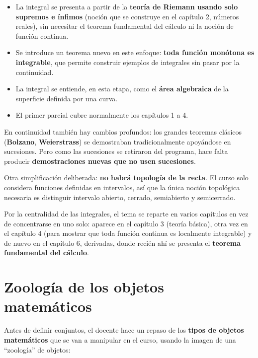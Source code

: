 \documentclass[12pt,a4paper]{article}
\begin{document}
\begin{itemize}
  \item La integral se presenta a partir de la \textbf{teoría de Riemann
    usando solo supremos e ínfimos} (noción que se construye en el
    capítulo 2, números reales), sin necesitar el teorema fundamental del
    cálculo ni la noción de función continua.
  \item Se introduce un teorema nuevo en este enfoque: \textbf{toda función
    monótona es integrable}, que permite construir ejemplos de integrales
    sin pasar por la continuidad.
  \item La integral se entiende, en esta etapa, como el \textbf{área
    algebraica} de la superficie definida por una curva.
  \item El primer parcial cubre normalmente los capítulos 1 a 4.
\end{itemize}

\begin{sloppypar}
En continuidad también hay cambios profundos: los grandes teoremas
clásicos (\textbf{Bolzano}, \textbf{Weierstrass}) se demostraban
tradicionalmente apoyándose en sucesiones. Pero como las sucesiones se
retiraron del programa, hace falta producir \textbf{demostraciones
nuevas que no usen sucesiones}.
\end{sloppypar}

Otra simplificación deliberada: \textbf{no habrá topología de la recta}. El
curso solo considera funciones definidas en intervalos, así que la única
noción topológica necesaria es distinguir intervalo abierto, cerrado,
semiabierto y semicerrado.

Por la centralidad de las integrales, el tema se reparte en varios
capítulos en vez de concentrarse en uno solo: aparece en el capítulo 3
(teoría básica), otra vez en el capítulo 4 (para mostrar que toda función
continua es localmente integrable) y de nuevo en el capítulo 6, derivadas,
donde recién ahí se presenta el \textbf{teorema fundamental del cálculo}.

\section{Zoología de los objetos matemáticos}

Antes de definir conjuntos, el docente hace un repaso de los \textbf{tipos
de objetos matemáticos} que se van a manipular en el curso, usando la
imagen de una ``zoología'' de objetos:
\end{document}
